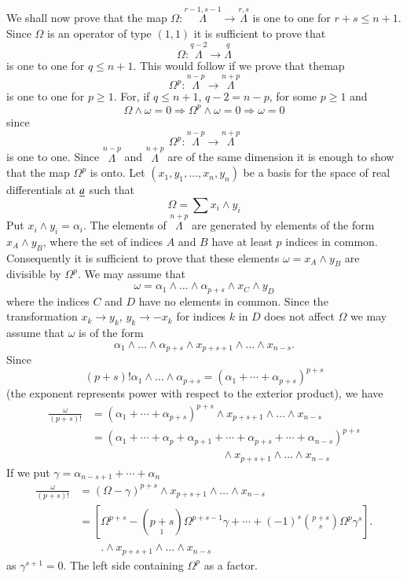 We shall now prove that the map
  $\Omega:\overset{r-1,s-1}{\Lambda}\to \overset{r,s}{\Lambda}$ is one
to one for $r+s\leq n+1$. Since $\Omega$ is an operator of type
$(1,1)$ it is sufficient to prove that
$$
\Omega:\overset{q-2}{\Lambda}\to \overset{q}{\Lambda}
$$
is one to one for $q\leq n+1$. This would follow if we prove that
the\pageoriginale map
$$
\Omega^{p}:\overset{n-p}{\Lambda}\to \overset{n+p}{\Lambda}
$$
is one to one for $p\geq 1$. For, if $q\leq n+1$, $q-2=n-p$, for some
$p\geq 1$ and
$$
\Omega\wedge\omega=0\Rightarrow \Omega^{p}\wedge\omega=0\Rightarrow
\omega=0
$$
since
$$
\Omega^{p}:\overset{n-p}{\Lambda}\to \overset{n+p}{\Lambda}
$$
is one to one. Since $\overset{n-p}{\Lambda}$ and
$\overset{n+p}{\Lambda}$ are of the same dimension it is enough to
show that the map $\Omega^{p}$ is onto. Let
$(x_{1},y_{1},\ldots,x_{n},y_{n})$ be a basis for the space of real
differentials at $\underline{a}$ such that
$$
\Omega=\sum x_{i}\wedge y_{i}
$$
Put $x_{i}\wedge y_{i}=\alpha_{i}$. The elements of
$\overset{n+p}{\Lambda}$ are generated by elements of the form
$x_{A}\wedge y_{B}$, where the set of indices $A$ and $B$ have at
least $p$ indices in common. Consequently it is sufficient to prove
that these elements $\omega=x_{A}\wedge y_{B}$ are divisible by
$\Omega^{p}$. We may assume that
$$
\omega=\alpha_{1}\wedge\ldots\wedge \alpha_{p+s}\wedge x_{C}\wedge
y_{D}
$$
where the indices $C$ and $D$ have no elements in common. Since the
transformation $x_{k}\to y_{k}$, $y_{k}\to -x_{k}$ for indices $k$ in
$D$ does not affect $\Omega$ we may assume that $\omega$ is of the
form
$$
\alpha_{1}\wedge\ldots\wedge \alpha_{p+s}\wedge
x_{p+s+1}\wedge\ldots\wedge x_{n-s}.
$$
Since\pageoriginale
$$
(p+s)!\alpha_{1}\wedge\ldots\wedge
\alpha_{p+s}=(\alpha_{1}+\cdots+\alpha_{p+s})^{p+s}  
$$
(the exponent represents power with respect to the exterior product),
we have
\begin{align*}
\frac{\omega}{(p+s)!} &= (\alpha_{1}+\cdots+\alpha_{p+s})^{p+s}\wedge
x_{p+s+1}\wedge\ldots\wedge x_{n-s}\\
&=
(\alpha_{1}+\cdots+\alpha_{p}+\alpha_{p+1}+\cdots+\alpha_{p+s} +
\cdots+\alpha_{n-s})^{p+s}\\
& \hspace{5cm} \wedge x_{p+s+1}\wedge\ldots\wedge x_{n-s}
\end{align*}
If we put $\gamma=\alpha_{n-s+1}+\cdots+\alpha_{n}$
\begin{align*}
\frac{\omega}{(p+s)!} &= (\Omega-\gamma)^{p+s}\wedge
x_{p+s+1}\wedge\ldots \wedge x_{n-s}\\ 
&= [\Omega^{p+s}-(\underset{1}{p+s})\Omega^{p+s-1} \gamma+\cdots+
  (-1)^s\binom{p+s}{s}\Omega^{p}\gamma^{s}].\\   
&\qquad .\wedge x_{p+s+1}\wedge\ldots\wedge x_{n-s}
\end{align*}
as $\gamma^{s+1}=0$. The left side containing $\Omega^{p}$ as a
factor.

